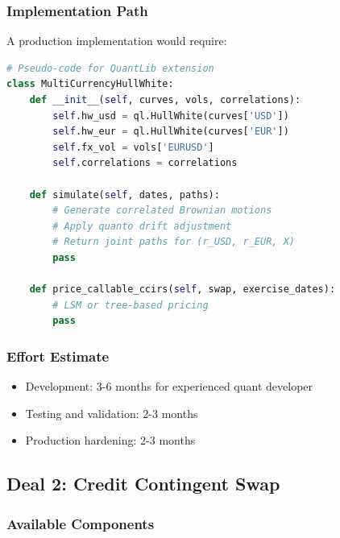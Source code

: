 \documentclass[conference]{IEEEtran}
\theoremstyle{definition}
\begin{document}
\subsubsection{Implementation Path}

A production implementation would require:

\begin{lstlisting}[language=Python, caption=Conceptual QuantLib Extension]
# Pseudo-code for QuantLib extension
class MultiCurrencyHullWhite:
    def __init__(self, curves, vols, correlations):
        self.hw_usd = ql.HullWhite(curves['USD'])
        self.hw_eur = ql.HullWhite(curves['EUR'])
        self.fx_vol = vols['EURUSD']
        self.correlations = correlations

    def simulate(self, dates, paths):
        # Generate correlated Brownian motions
        # Apply quanto drift adjustment
        # Return joint paths for (r_USD, r_EUR, X)
        pass

    def price_callable_ccirs(self, swap, exercise_dates):
        # LSM or tree-based pricing
        pass
\end{lstlisting}

\subsubsection{Effort Estimate}

\begin{itemize}
    \item Development: 3-6 months for experienced quant developer
    \item Testing and validation: 2-3 months
    \item Production hardening: 2-3 months
\end{itemize}

\subsection{Deal 2: Credit Contingent Swap}

\subsubsection{Available Components}
\end{document}
